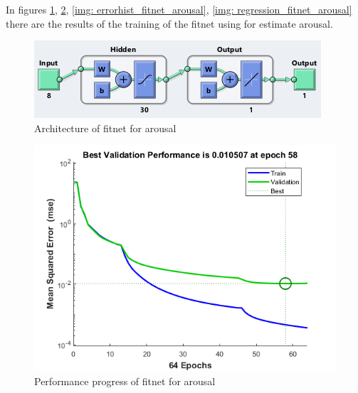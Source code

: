 \documentclass[a4paper]{report}
\begin{document}
	
	\noindent In figures \ref{img: fitnet_arousal}, \ref{img: perf_fitnet_arousal}, \ref{img: errorhist_fitnet_arousal}, \ref{img: regression_fitnet_arousal} there are the results of the training of the fitnet using for estimate arousal.
	\vspace{1cm}
		\begin{figure}[htbp]
		\centering
		\includegraphics[scale=1]{img/fitnet_arousal.png}
		\caption{Architecture of fitnet for arousal}
		\label{img: fitnet_arousal}
	\end{figure}
	
		\vspace{3cm}
		
	\begin{figure}[htbp]
		\centering
		\includegraphics[scale=1]{img/perf_fitnet_arousal.png}
		\caption{Performance progress of fitnet for arousal}
		\label{img: perf_fitnet_arousal}
	\end{figure}
	
\end{document}
